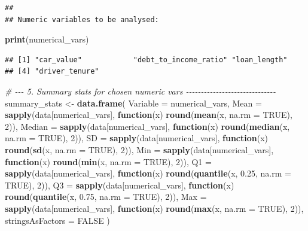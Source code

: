 \documentclass[
]{article}
\newenvironment{Shaded}{\begin{snugshade}}{\end{snugshade}}
\newcommand{\AttributeTok}[1]{\textcolor[rgb]{0.13,0.29,0.53}{#1}}
\newcommand{\CommentTok}[1]{\textcolor[rgb]{0.56,0.35,0.01}{\textit{#1}}}
\newcommand{\ConstantTok}[1]{\textcolor[rgb]{0.56,0.35,0.01}{#1}}
\newcommand{\ControlFlowTok}[1]{\textcolor[rgb]{0.13,0.29,0.53}{\textbf{#1}}}
\newcommand{\DecValTok}[1]{\textcolor[rgb]{0.00,0.00,0.81}{#1}}
\newcommand{\FloatTok}[1]{\textcolor[rgb]{0.00,0.00,0.81}{#1}}
\newcommand{\FunctionTok}[1]{\textcolor[rgb]{0.13,0.29,0.53}{\textbf{#1}}}
\newcommand{\NormalTok}[1]{#1}
\newcommand{\OtherTok}[1]{\textcolor[rgb]{0.56,0.35,0.01}{#1}}
\begin{document}
\begin{verbatim}
## 
## Numeric variables to be analysed:
\end{verbatim}

\begin{Shaded}
\begin{Highlighting}[]
\FunctionTok{print}\NormalTok{(numerical\_vars)}
\end{Highlighting}
\end{Shaded}

\begin{verbatim}
## [1] "car_value"            "debt_to_income_ratio" "loan_length"         
## [4] "driver_tenure"
\end{verbatim}

\begin{Shaded}
\begin{Highlighting}[]
\CommentTok{\# {-}{-}{-} 5. Summary stats for chosen numeric vars {-}{-}{-}{-}{-}{-}{-}{-}{-}{-}{-}{-}{-}{-}{-}{-}{-}{-}{-}{-}{-}{-}{-}{-}{-}{-}{-}{-}{-}{-}}
\NormalTok{summary\_stats }\OtherTok{\textless{}{-}} \FunctionTok{data.frame}\NormalTok{(}
  \AttributeTok{Variable =}\NormalTok{ numerical\_vars,}
  \AttributeTok{Mean =} \FunctionTok{sapply}\NormalTok{(data[numerical\_vars], }\ControlFlowTok{function}\NormalTok{(x) }\FunctionTok{round}\NormalTok{(}\FunctionTok{mean}\NormalTok{(x, }\AttributeTok{na.rm =} \ConstantTok{TRUE}\NormalTok{), }\DecValTok{2}\NormalTok{)),}
  \AttributeTok{Median =} \FunctionTok{sapply}\NormalTok{(data[numerical\_vars], }\ControlFlowTok{function}\NormalTok{(x) }\FunctionTok{round}\NormalTok{(}\FunctionTok{median}\NormalTok{(x, }\AttributeTok{na.rm =} \ConstantTok{TRUE}\NormalTok{), }\DecValTok{2}\NormalTok{)),}
  \AttributeTok{SD =} \FunctionTok{sapply}\NormalTok{(data[numerical\_vars], }\ControlFlowTok{function}\NormalTok{(x) }\FunctionTok{round}\NormalTok{(}\FunctionTok{sd}\NormalTok{(x, }\AttributeTok{na.rm =} \ConstantTok{TRUE}\NormalTok{), }\DecValTok{2}\NormalTok{)),}
  \AttributeTok{Min =} \FunctionTok{sapply}\NormalTok{(data[numerical\_vars], }\ControlFlowTok{function}\NormalTok{(x) }\FunctionTok{round}\NormalTok{(}\FunctionTok{min}\NormalTok{(x, }\AttributeTok{na.rm =} \ConstantTok{TRUE}\NormalTok{), }\DecValTok{2}\NormalTok{)),}
  \AttributeTok{Q1 =} \FunctionTok{sapply}\NormalTok{(data[numerical\_vars], }\ControlFlowTok{function}\NormalTok{(x) }\FunctionTok{round}\NormalTok{(}\FunctionTok{quantile}\NormalTok{(x, }\FloatTok{0.25}\NormalTok{, }\AttributeTok{na.rm =} \ConstantTok{TRUE}\NormalTok{), }\DecValTok{2}\NormalTok{)),}
  \AttributeTok{Q3 =} \FunctionTok{sapply}\NormalTok{(data[numerical\_vars], }\ControlFlowTok{function}\NormalTok{(x) }\FunctionTok{round}\NormalTok{(}\FunctionTok{quantile}\NormalTok{(x, }\FloatTok{0.75}\NormalTok{, }\AttributeTok{na.rm =} \ConstantTok{TRUE}\NormalTok{), }\DecValTok{2}\NormalTok{)),}
  \AttributeTok{Max =} \FunctionTok{sapply}\NormalTok{(data[numerical\_vars], }\ControlFlowTok{function}\NormalTok{(x) }\FunctionTok{round}\NormalTok{(}\FunctionTok{max}\NormalTok{(x, }\AttributeTok{na.rm =} \ConstantTok{TRUE}\NormalTok{), }\DecValTok{2}\NormalTok{)),}
  \AttributeTok{stringsAsFactors =} \ConstantTok{FALSE}
\NormalTok{)}


\end{Highlighting}
\end{Shaded}
\end{document}
